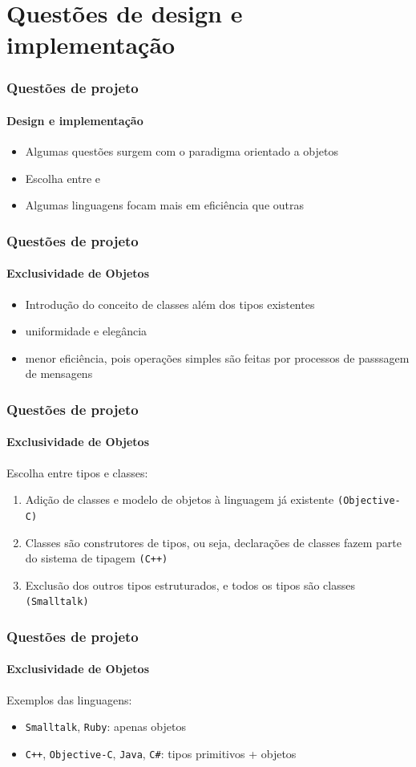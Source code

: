 \section{Questões de design e implementação}

\begin{frame}
\frametitle{Questões de projeto}
\framesubtitle{Design e implementação}
\begin{itemize}
	\item Algumas questões surgem com o paradigma orientado a objetos
	\item Escolha entre  e 
	\item Algumas linguagens focam mais em eficiência que outras
\end{itemize}
\end{frame}

\begin{frame}
\frametitle{Questões de projeto}
\framesubtitle{Exclusividade de Objetos}
\begin{itemize}
	\item Introdução do conceito de classes além dos tipos existentes
	\item {} uniformidade e elegância
	\item {} menor eficiência, pois operações simples são feitas por processos de passsagem de mensagens
\end{itemize}
\end{frame}

\begin{frame}
\frametitle{Questões de projeto}
\framesubtitle{Exclusividade de Objetos}
Escolha entre tipos e classes:
\begin{enumerate}
\item Adição de classes e modelo de objetos à linguagem já existente \texttt{(Objective-C)}
\item Classes são construtores de tipos, ou seja, declarações de classes fazem parte do sistema de tipagem \texttt{(C++)}
\item Exclusão dos outros tipos estruturados, e todos os tipos são classes \texttt{(Smalltalk)}
\end{enumerate}
\end{frame}


\begin{frame}
\frametitle{Questões de projeto}
\framesubtitle{Exclusividade de Objetos}
Exemplos das linguagens:

\begin{itemize}
\item \texttt{Smalltalk}, \texttt{Ruby}: apenas objetos
\item \texttt{C++}, \texttt{Objective-C}, \texttt{Java}, \texttt{C\#}: tipos primitivos + objetos
\end{itemize}
\end{frame}

